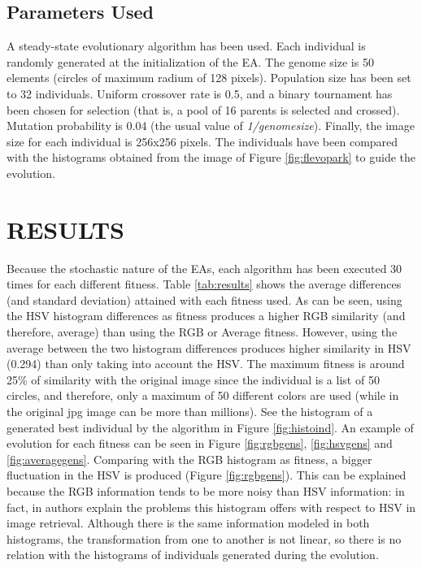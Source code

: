 \documentclass[a4paper,twoside]{article}
\begin{document}
\subsection{Parameters Used}

A steady-state evolutionary algorithm has been used. Each individual is randomly generated at the initialization of the EA. The genome size is 50 elements (circles of maximum radium of 128 pixels). Population size has been set to 32 individuals. Uniform crossover rate is 0.5, and a binary tournament has been chosen for selection (that is, a pool of 16 parents is selected and crossed). Mutation probability is 0.04 (the usual value of {\em 1/genomesize}). Finally, the image size for each individual is 256x256 pixels. The individuals have been compared with the histograms obtained from the image of Figure \ref{fig:flevopark} to guide the evolution. 

\section{\uppercase{RESULTS}}
\label{sec:results}

\noindent Because the stochastic nature of the EAs, each algorithm has been executed 30 times for each different fitness. Table \ref{tab:results} shows the average differences (and standard deviation) attained with each fitness used. As can be seen, using the HSV histogram differences as fitness produces a higher RGB similarity (and therefore, average) than using the RGB or Average fitness. However, using the average between the two histogram differences produces higher similarity in HSV (0.294) than only taking into account the HSV. The maximum fitness is around 25\% of similarity with the original image since the individual is a list of 50 circles, and therefore, only a maximum of 50 different colors are used (while in the original jpg image can be more than millions). See the histogram of a generated best individual by the algorithm in Figure \ref{fig:histoind}. An example of evolution for each fitness can be seen in Figure \ref{fig:rgbgens}, \ref{fig:hsvgens} and \ref{fig:averagegens}. Comparing with the RGB histogram as fitness, a bigger fluctuation in the HSV is produced (Figure \ref{fig:rgbgens}). This can be explained because the RGB information tends to be more noisy than HSV information: in fact, in \cite{COLORDIFFERENCES} authors explain the problems this histogram offers with respect to HSV in image retrieval. Although there is the same information modeled in both histograms, the transformation from one to another is not linear, so there is no relation with the histograms of individuals generated during the evolution.
\end{document}
